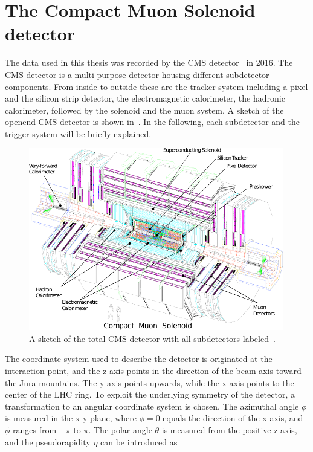 \section{The Compact Muon Solenoid detector}\label{sec:CMS}
The data used in this thesis was recorded by the CMS detector~\cite{CMS,CMSTDR} in 2016. The CMS detector is a multi-purpose detector housing different subdetector components. From inside to outside these are the tracker system including a pixel and the silicon strip detector, the electromagnetic calorimeter, the hadronic calorimeter, followed by the solenoid and the muon system. A sketch of the openend CMS detector is shown in~. In the following, each subdetector and the trigger system will be briefly explained.\\
\begin{figure}[tbp]
 \centering
 \includegraphics[width=0.99\textwidth]{figures/general/cms}
 \caption{A sketch of the total CMS detector with all subdetectors labeled~\cite{CMSTDR}.}
 \label{fig:CMS}
\end{figure}
The coordinate system used to describe the detector is originated at the interaction point, and the z-axis points in the direction of the beam axis toward the Jura mountains. The y-axis points upwards, while the x-axis points to the center of the LHC ring. To exploit the underlying symmetry of the detector, a transformation to an angular coordinate system is chosen. The azimuthal angle $\phi$ is measured in the x-y plane, where $\phi=0$ equals the direction of the x-axis, and $\phi$ ranges from $-\pi$ to $\pi$. The polar angle $\theta$ is measured from the positive z-axis, and the pseudorapidity $\eta$ can be introduced as
